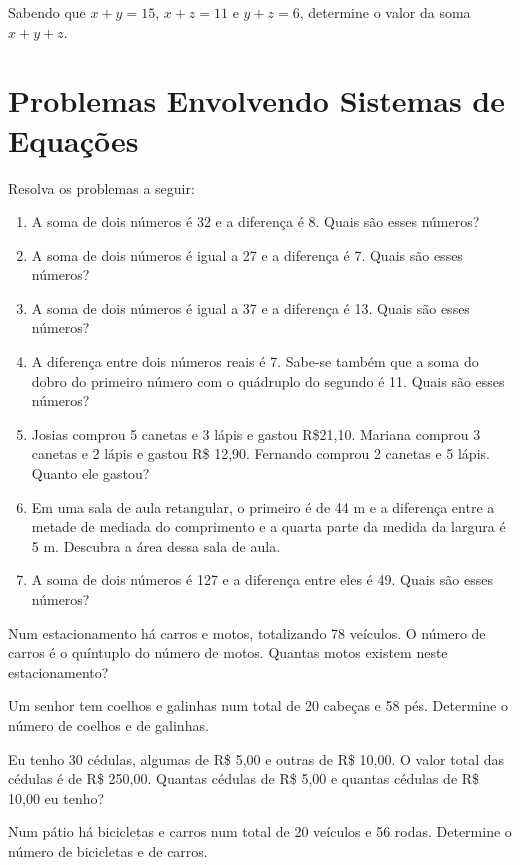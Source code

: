 	\item Sabendo que $x+y=15$, $x+z=11$ e $y+z=6$, determine o valor da soma $x+y+z$.
	
\section{Problemas Envolvendo Sistemas de Equações}
	
	\item Resolva os problemas a seguir:
	\begin{enumerate}
		\item A soma de dois números é 32 e a diferença é 8. Quais são esses números?
		\item A soma de dois números é igual a 27 e a diferença é 7. Quais são esses números?
		\item A soma de dois números é igual a 37 e a diferença é 13. Quais são esses números?			
		\item A diferença entre dois números reais é 7. Sabe-se também que a soma do dobro do primeiro número com o quádruplo do segundo é 11. Quais são esses números?
		
		\item Josias comprou 5 canetas e 3 lápis e gastou R\$21,10. Mariana comprou 3 canetas e 2 lápis e gastou R\$ 12,90. Fernando comprou 2 canetas e 5 lápis. Quanto ele gastou?
		
		\item Em uma sala de aula retangular, o primeiro é de 44 m e a diferença entre a metade de mediada do comprimento e a quarta parte da medida da largura é 5 m. Descubra a área dessa sala de aula.
		\item A soma de dois números é 127 e a diferença entre eles é 49. Quais são esses números?
	\end{enumerate}
	\item Num estacionamento há carros e motos, totalizando 78 veículos. O número de carros é o quíntuplo do número de motos. Quantas motos existem neste estacionamento?
	
	\item Um senhor tem coelhos e galinhas num total de 20 cabeças e 58 pés. Determine o número de coelhos e de galinhas.	
	
	\item Eu tenho 30 cédulas, algumas de R\$ 5,00 e outras de R\$ 10,00. O valor total das cédulas é de R\$ 250,00. Quantas cédulas de R\$ 5,00 e quantas cédulas de R\$ 10,00 eu tenho?
	
	\item Num pátio há bicicletas e carros num total de 20 veículos e 56 rodas. Determine o número de bicicletas e de carros.
	
